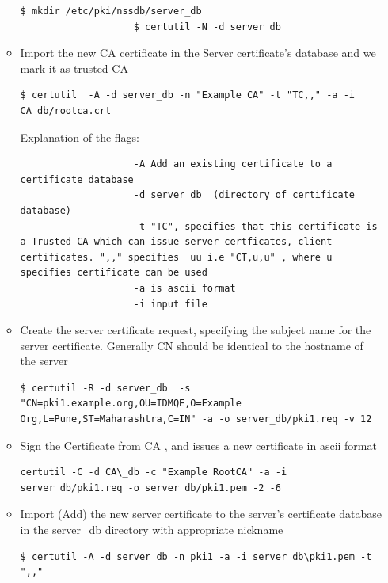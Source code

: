 \documentclass[a4paper]{article}
\begin{document}
\begin{enumerate}[label*=\arabic*.]
\begin{itemize}
\begin{lstlisting}[style=BashInputStyle]
                    $ mkdir /etc/pki/nssdb/server_db
                    $ certutil -N -d server_db
                \end{lstlisting}
            \item Import the new CA certificate in the Server certificate's database and we mark it as trusted CA
                \begin{lstlisting}[style=BashInputStyle]
                    $ certutil  -A -d server_db -n "Example CA" -t "TC,," -a -i CA_db/rootca.crt
                \end{lstlisting}
            Explanation of the flags:
                \begin{lstlisting}
                    -A Add an existing certificate to a certificate database
                    -d server_db  (directory of certificate database)
                    -t "TC", specifies that this certificate is a Trusted CA which can issue server certficates, client certificates. ",," specifies  uu i.e "CT,u,u" , where u specifies certificate can be used
                    -a is ascii format
                    -i input file
                \end{lstlisting}
            \item Create the server certificate request, specifying the subject name for the server certificate. Generally CN should be identical to the hostname of the server
                \begin{lstlisting}[style=BashInputStyle]
                    $ certutil -R -d server_db  -s "CN=pki1.example.org,OU=IDMQE,O=Example Org,L=Pune,ST=Maharashtra,C=IN" -a -o server_db/pki1.req -v 12
                \end{lstlisting}
            \item Sign the Certificate from CA , and  issues a  new certificate in ascii format

                \begin{lstlisting}[style=BashInputStyle]
                    certutil -C -d CA\_db -c "Example RootCA" -a -i server_db/pki1.req -o server_db/pki1.pem -2 -6
                \end{lstlisting}

            \item Import (Add) the new server certificate to the server's certificate database in the server\_db directory with appropriate nickname
                 \begin{lstlisting}[style=BashInputStyle]
                    $ certutil -A -d server_db -n pki1 -a -i server_db\pki1.pem -t ",,"
                 \end{lstlisting}


\end{itemize}
\end{enumerate}
\end{document}
